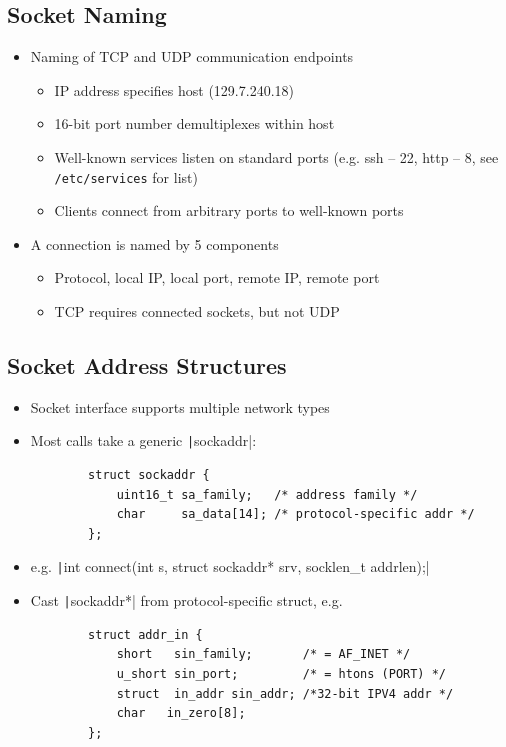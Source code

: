 \subsection{Socket Naming}
\begin{itemize}[nosep]
    \item Naming of TCP and UDP communication endpoints
          \begin{itemize}[nosep]
              \item IP address specifies host (129.7.240.18)
              \item 16-bit port number demultiplexes within host
              \item Well-known services listen on standard ports (e.g. ssh -- 22, http -- 8, see \texttt{/etc/services} for list)
              \item Clients connect from arbitrary ports to well-known ports
          \end{itemize}
    \item A connection is named by 5 components
          \begin{itemize}[nosep]
              \item Protocol, local IP, local port, remote IP, remote port
              \item TCP requires connected sockets, but not UDP
          \end{itemize}
\end{itemize}
\subsection{Socket Address Structures}
\begin{itemize}[nosep]
    \item Socket interface supports multiple network types
    \item Most calls take a generic \texttt|sockaddr|:
          \begin{verbatim}
        struct sockaddr {
            uint16_t sa_family;   /* address family */
            char     sa_data[14]; /* protocol-specific addr */
        };
    \end{verbatim}
    \item e.g. \texttt|int connect(int s, struct sockaddr* srv, socklen_t addrlen);|
    \item Cast \texttt|sockaddr*| from protocol-specific struct, e.g.
          \begin{verbatim}
        struct addr_in {
            short   sin_family;       /* = AF_INET */
            u_short sin_port;         /* = htons (PORT) */
            struct  in_addr sin_addr; /*32-bit IPV4 addr */
            char   in_zero[8];
        };
    \end{verbatim}
\end{itemize}
